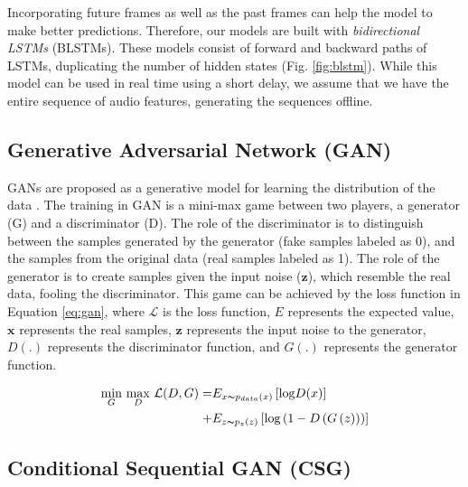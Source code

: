 \documentclass[10pt,journal,compsoc]{IEEEtran}
\begin{document}
Incorporating future frames as well as the past frames can help the model to make better predictions. Therefore, our models are built with \emph{bidirectional LSTMs} (BLSTMs). These models consist of forward and backward paths of LSTMs, duplicating the number of hidden states (Fig. \ref{fig:blstm}). While this model can be used in real time using a short delay, we assume that we have the entire sequence of audio features, generating the sequences offline.

\subsection{Generative Adversarial Network (GAN)}
\label{ssec:GAN}

GANs are proposed as a generative model for learning the distribution of the data \cite{Goodfellow_2014}. The training in GAN is a mini-max game between two players, a generator (G) and a discriminator (D). The role of the discriminator is to distinguish between the samples generated by the generator (fake samples labeled as 0), and the samples from the original data (real samples labeled as 1). The role of the generator is to create samples given the input noise ($\mathbf{z}$), which resemble the real data, fooling the discriminator. This game can be achieved by the loss function in Equation \ref{eq:gan}, where $\mathcal{L}$ is the loss function, $E$ represents the expected value, $\mathbf{x}$ represents the real samples, $\mathbf{z}$ represents the input noise to the generator, $D(.)$ represents the discriminator function, and $G(.)$ represents the generator function.

\begin{equation}
\begin{split}
\underset{G}{\mathrm{min}}\ \underset{D}{\mathrm{max}}\ \mathcal{L}(D, G) =& E_{x\thicksim p_{data}(x)}\left[\mathrm{log} D(x)\right] \\
+ &E_{z\thicksim p_{z}(z)}\left[\mathrm{log} \left(1-D\left(G\left(z\right)\right)\right)\right]
\end{split}
\label{eq:gan}
\end{equation}




\subsection{Conditional Sequential GAN (CSG)}
\label{ssec:CSG}
\end{document}
